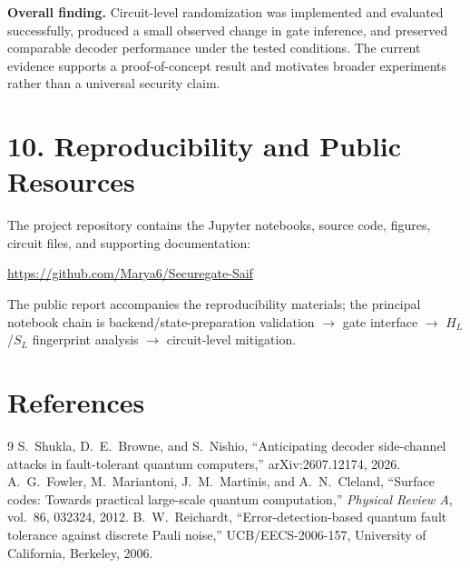 \documentclass[9pt,a4paper]{article}
\newcommand{\HL}{\ensuremath{H_L}}
\newcommand{\SL}{\ensuremath{S_L}}
\begin{document}
\begin{boxm}
\textbf{Overall finding.} Circuit-level randomization was implemented and evaluated successfully, produced a small observed change in gate inference, and preserved comparable decoder performance under the tested conditions. The current evidence supports a proof-of-concept result and motivates broader experiments rather than a universal security claim.
\end{boxm}

\section*{10. Reproducibility and Public Resources}
The project repository contains the Jupyter notebooks, source code, figures, circuit files, and supporting documentation:
\begin{center}
\url{https://github.com/Marya6/Securegate-Saif}
\end{center}
The public report accompanies the reproducibility materials; the principal notebook chain is backend/state-preparation validation $\rightarrow$ gate interface $\rightarrow$ \HL/\SL{} fingerprint analysis $\rightarrow$ circuit-level mitigation.

\section*{References}
\begin{thebibliography}{9}\small
{} S.~Shukla, D.~E.~Browne, and S.~Nishio, ``Anticipating decoder side-channel attacks in fault-tolerant quantum computers,'' arXiv:2607.12174, 2026.
 A.~G.~Fowler, M.~Mariantoni, J.~M.~Martinis, and A.~N.~Cleland, ``Surface codes: Towards practical large-scale quantum computation,'' \emph{Physical Review A}, vol.~86, 032324, 2012.
 B.~W.~Reichardt, ``Error-detection-based quantum fault tolerance against discrete Pauli noise,'' UCB/EECS-2006-157, University of California, Berkeley, 2006.
\end{thebibliography}
\end{document}
